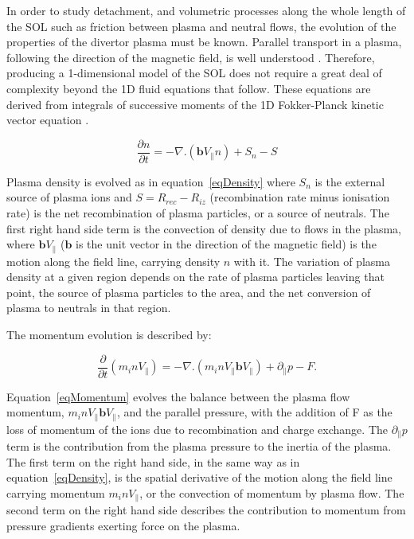 \documentclass[12pt]{article}  %
\begin{document}
In order to study detachment, and volumetric processes along the whole length of the SOL such as friction between plasma and neutral flows, the evolution of the properties of the divertor plasma must be known. Parallel transport in a plasma, following the direction of the magnetic field, is well understood \cite{Fundamenski2009}. Therefore, producing a 1-dimensional model of the SOL does not require a great deal of complexity beyond the 1D fluid equations that follow. These equations are derived from integrals of successive moments of the 1D Fokker-Planck kinetic vector equation \cite{Stangeby}.

  \begin{equation}\label{eqDensity}
  \frac{\partial n}{\partial t} = -\nabla . (\textbf{b}V_{\parallel}n) + S_n - S
  \end{equation}

Plasma density is evolved as in equation~\ref{eqDensity} where $S_n$ is the external source of plasma ions and $S=R_{rec} - R_{iz}$ (recombination rate minus ionisation rate) is the net recombination of plasma particles, or a source of neutrals. The first right hand side term is the convection of density due to flows in the plasma, where $\textbf{b}V_{\parallel}$ ($\textbf{b}$ is the unit vector in the direction of the magnetic field) is the motion along the field line, carrying density $n$ with it. The variation of plasma density at a given region depends on the rate of plasma particles leaving that point, the source of plasma particles to the area, and the net conversion of plasma to neutrals in that region.

The momentum evolution is described by:

  \begin{equation}\label{eqMomentum}
  \frac{\partial}{\partial t}(m_i n V_{\parallel}) = -\nabla . (m_i n V_{\parallel} \textbf{b} V_{\parallel}) + \partial_{\parallel}p - F.
  \end{equation}

Equation~\ref{eqMomentum} evolves the balance between the plasma flow momentum, $m_inV_{\parallel}\textbf{b}V_{\parallel}$, and the parallel pressure, with the addition of F as the loss of momentum of the ions due to recombination and charge exchange. The $\partial_{\parallel}p$ term is the contribution from the plasma pressure to the inertia of the plasma. The first term on the right hand side, in the same way as in equation~\ref{eqDensity}, is the spatial derivative of the motion along the field line carrying momentum $m_i n V_{\parallel}$, or the convection of momentum by plasma flow. The second term on the right hand side describes the contribution to momentum from pressure gradients exerting force on the plasma.
\end{document}

